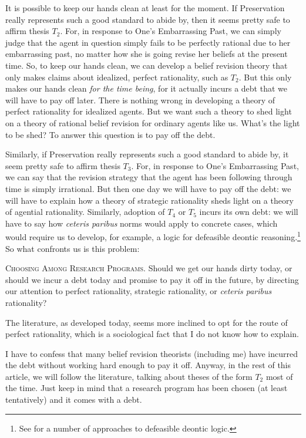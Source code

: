 It is possible to keep our hands clean at least for the moment. If Preservation really represents such a good standard to abide by, then it seems pretty safe to affirm thesis $T_2$. For, in response to One's Embarrassing Past, we can simply judge that the agent in question simply fails to be perfectly rational due to her embarrassing past, no matter how she is going revise her beliefs at the present time. So, to keep our hands clean, we can develop a belief revision theory that only makes claims about idealized, perfect rationality, such as $T_2$. But this only makes our hands clean {\em for the time being}, for it actually incurs a debt that we will have to pay off later. There is nothing wrong in developing a theory of perfect rationality for idealized agents. But we want such a theory to shed light on a theory of rational belief revision for ordinary agents like us. What's the light to be shed? To answer this question is to pay off the debt.

Similarly, if Preservation really represents such a good standard to abide by, it seem pretty safe to affirm thesis $T_3$. For, in response to One's Embarrassing Past, we can say that the revision strategy that the agent has been following through time is simply irrational. But then one day we will have to pay off the debt: we will have to explain how a theory of strategic rationality sheds light on a theory of agential rationality. Similarly, adoption of $T_4$ or $T_5$ incurs its own debt: we will have to say how {\em ceteris paribus} norms would apply to concrete cases, which would require us to develop, for example, a logic for defeasible deontic reasoning.\footnote{See \citet{nute2012defeasible} for a number of approaches to defeasible deontic logic.} So what confronts us is this problem:\op

	\xm \textsc{Choosing Among Research Programs.} Should we get our hands dirty today, or should we incur a debt today and promise to pay it off in the future, by directing our attention to perfect rationality, strategic rationality, or {\em ceteris paribus} rationality? 

\ed The literature, as developed today, seems more inclined to opt for the route of perfect rationality, which is a sociological fact that I do not know how to explain.

I have to confess that many belief revision theorists (including me) have incurred the debt without working hard enough to pay it off. Anyway, in the rest of this article, we will follow the literature, talking about theses of the form $T_2$ most of the time. Just keep in mind that a research program has been chosen (at least tentatively) and it comes with a debt.




